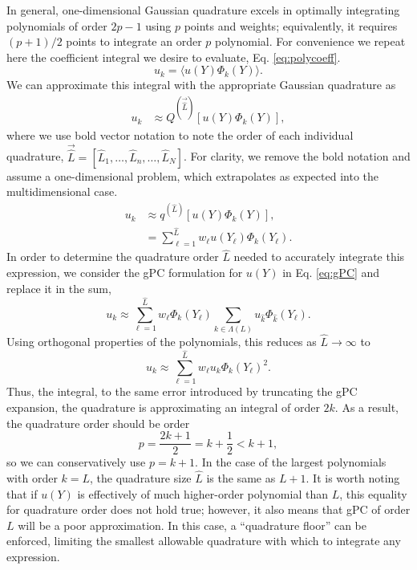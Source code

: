 In general, one-dimensional Gaussian
quadrature excels in optimally integrating polynomials of order $2p-1$ using $p$ points and weights;
equivalently, it requires $(p+1)/2$ points to integrate an order $p$ polynomial. 
For convenience we repeat here the coefficient integral we desire to evaluate, Eq.
\ref{eq:polycoeff}.
\begin{equation}
  u_k = \langle u(Y)\Phi_k(Y) \rangle.
\end{equation}
We can approximate this integral with the appropriate Gaussian quadrature as
\begin{align}
  u_k &\approx Q^{(\vec{\hat L})}[u(Y)\Phi_k(Y)],
\end{align}
where we use bold vector notation to note the order of each individual quadrature,
$\vec{\hat L} = [\hat L_1, \ldots,\hat L_n,\ldots,\hat L_N]$. For clarity, we remove the bold notation and
assume a one-dimensional problem, which extrapolates as expected into the multidimensional case.
\begin{align}
  u_k &\approx q^{(\hat L)}[u(Y)\Phi_k(Y)],\\
      &= \sum_{\ell=1}^{\hat L} w_\ell u(Y_\ell)\Phi_k(Y_\ell).
\end{align}
In order to determine the quadrature order $\hat L$ needed to accurately integrate this expression, we consider the
gPC formulation for $u(Y)$ in Eq. \ref{eq:gPC} and replace it in the sum,
\begin{equation}
  u_k\approx \sum_{\ell=1}^{\hat L} w_\ell \Phi_k(Y_\ell) \sum_{k\in\Lambda(L)}u_{\hat k}\Phi_{\hat k}(Y_\ell).
\end{equation}
Using orthogonal properties of the polynomials, this reduces as $\hat L\to\infty$ to
\begin{equation}
  u_k\approx \sum_{\ell=1}^{\hat L} w_\ell u_k \Phi_k(Y_\ell)^2.
\end{equation}
Thus, the integral, to the same error introduced by truncating the  gPC expansion, the quadrature is
approximating an integral of order $2k$. As a result, the quadrature order should be order 
\begin{equation}
  p=\frac{2k+1}{2}=k+\frac{1}{2}<k+1,
\end{equation}
so we can conservatively use $p=k+1$.  In the case of the largest polynomials with order
$k=L$, the quadrature size $\hat L$ is the same as $L+1$.  It is worth noting that if $u(Y)$ is effectively of
much higher-order polynomial than $L$, this equality for quadrature order does not hold true; however, it also
means that gPC of order $L$ will be a poor approximation.  In this case, a ``quadrature floor'' can be
enforced, limiting the smallest allowable quadrature with which to integrate any expression.

